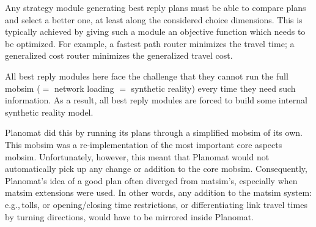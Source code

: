 \begin{compactitem}

\item Any strategy module generating best reply plans must be able to compare plans and select a better one, at least along the considered choice dimensions. This is typically achieved by giving such a module an objective function which needs to be optimized. For example, a fastest path router minimizes the travel time; a generalized cost router minimizes the generalized travel cost.

All best reply modules here face the challenge that they cannot run the full \gls{mobsim} ($=$ network loading $=$ synthetic reality) every time they need such information. As a result, all best reply modules are forced to build some internal synthetic reality model.  

Planomat did this by running its plans through a simplified \gls{mobsim} of its own. This \gls{mobsim} was a re-implementation of the most important core aspects \gls{mobsim}.
%
%
Unfortunately, however, this meant that Planomat would not automatically pick up any change or addition to the core \gls{mobsim}.
%
Consequently,  Planomat's idea of a good plan often diverged from \gls{matsim}'s, especially when \gls{matsim} extensions were used.
%
In other words, any addition to the \gls{matsim} system: e.g.,\,tolls, or opening/closing time restrictions, or differentiating link travel times by turning directions, would have to be mirrored inside Planomat.
%


\end{compactitem}
